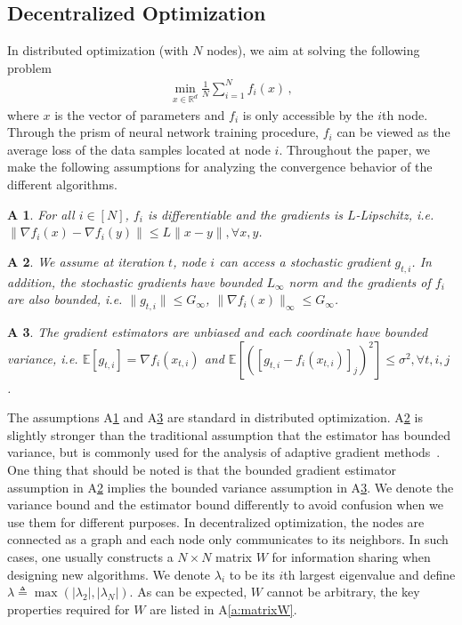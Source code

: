 \documentclass{article} %
\newtheorem{assumptionA}{A\!\!}
\begin{document}
\subsection{Decentralized Optimization }
In distributed optimization (with $N$ nodes), we aim at solving the following problem
\begin{align}\label{eq:minproblem}
\min_{x \in \mathbb{R}^d} \frac{1}{N}\sum_{i=1}^N f_i(x) \, ,
\end{align}
where $x$ is the vector of parameters and $f_i$ is only accessible by the $i$th node. 
Through the prism of neural network training procedure, $f_i$ can be viewed as the average loss of the data samples located at node $i$. 
Throughout the paper, we make the following assumptions for analyzing the convergence behavior of the different algorithms.
\begin{assumptionA}\label{a:diff}
For all $i \in [N]$, $f_i$ is differentiable and the gradients is $L$-Lipschitz, i.e. $\|\nabla f_i(x) - \nabla f_i(y) \| \leq L\|x-y\|, \forall x,y$.
\end{assumptionA}
\begin{assumptionA}\label{a:boundsto}
We assume at iteration $t$, node $i$ can access a stochastic gradient $g_{t,i}$. In addition,  the stochastic gradients have bounded $L_{\infty}$ norm and the gradients of $f_i$ are also bounded, i.e. $\|g_{t,i}\| \leq G_{\infty}$, $\|\nabla f_i(x)\|_{\infty} \leq G_{\infty}$. 
\end{assumptionA}
\begin{assumptionA}\label{a:boundedvar}
The gradient estimators are unbiased and each coordinate have bounded variance, i.e. $\mathbb E [g_{t,i}] = \nabla f_i(x_{t,i}) $ and $\mathbb E [([g_{t,i} - f_i(x_{t,i})]_j)^2] \leq  \sigma^2, \forall t,i,j$ . 
\end{assumptionA}
The assumptions A\ref{a:diff} and A\ref{a:boundedvar} are standard in distributed optimization. A\ref{a:boundsto} is slightly stronger than the traditional assumption that the estimator has bounded variance, but is commonly used for the analysis of adaptive gradient methods~\citep{chen2018convergence,ward2018adagrad}. 
One thing that should be noted is that the bounded gradient estimator assumption in A\ref{a:boundsto} implies the bounded variance assumption in A\ref{a:boundedvar}.
We denote the variance bound and the estimator bound differently to avoid confusion when we use them for different purposes. 
In decentralized optimization, the nodes are connected as a graph and each node only communicates to its neighbors. 
In such cases, one usually constructs a $N \times N$ matrix $W$  for information sharing when designing new algorithms. 
We denote $\lambda_i$ to be its $i$th largest eigenvalue and define $\lambda \triangleq \max (|\lambda_2|,|\lambda_N|)$.
As can be expected, $W$ cannot be arbitrary, the key properties required for $W$ are listed in A\ref{a:matrixW}.
\end{document}
